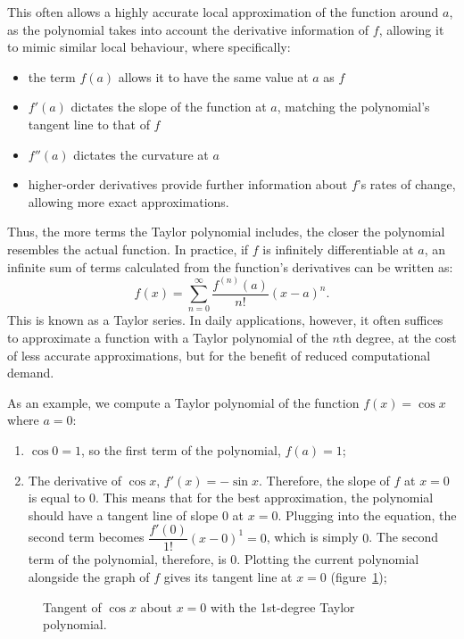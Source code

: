 \documentclass[a4paper, 12pt]{article}
\begin{document}
This often allows a highly accurate local approximation of the function around $a$, as the polynomial takes into account the derivative information of $f$, allowing it to mimic similar local behaviour, where specifically:
\begin{itemize}
    \item the term $f(a)$ allows it to have the same value at $a$ as $f$
    \item $f'(a)$ dictates the slope of the function at $a$, matching the polynomial’s tangent line to that of $f$
    \item $f''(a)$ dictates the curvature at $a$
    \item higher-order derivatives provide further information about $f$’s rates of change, allowing more exact approximations.
\end{itemize}

Thus, the more terms the Taylor polynomial includes, the closer the polynomial resembles the actual function. In practice, if $f$ is infinitely differentiable at $a$, an infinite sum of terms calculated from the function’s derivatives can be written as:
\begin{equation}
f(x)=\sum_{n=0}^{\infty} \frac{f^{(n)}(a)}{n!}(x-a)^n .
\end{equation}
This is known as a Taylor series. In daily applications, however, it often suffices to approximate a function with a Taylor polynomial of the $n$th degree, at the cost of less accurate approximations, but for the benefit of reduced computational demand.

As an example, we compute a Taylor polynomial of the function $f(x)=\cos x$ where $a=0$:
\begin{enumerate}
\item $\cos 0 = 1$, so the first term of the polynomial, $f(a)=1$;
\item The derivative of $\cos x$, $f'(x) = - \sin x$. Therefore, the slope of $f$ at $x=0$ is equal to $0$. This means that for the best approximation, the polynomial should have a tangent line of slope $0$ at $x=0$. Plugging into the equation, the second term becomes $\dfrac{f'(0)}{1!}(x-0)^1 = 0$, which is simply $0$. The second term of the polynomial, therefore, is $0$. Plotting the current polynomial alongside the graph of $f$ gives its tangent line at $x=0$ (figure~\ref{fig:t1});
\end{enumerate}

\begin{figure}[H]
\centering
{}
\caption{Tangent of $\cos x$ about $x=0$ with the 1st-degree Taylor polynomial.}
\label{fig:t1}
\end{figure}
\end{document}
